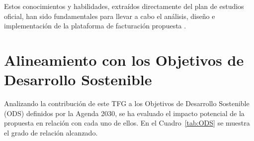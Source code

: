\begin{large}
Estos conocimientos y habilidades, extraídos directamente del plan de estudios oficial, han sido fundamentales para llevar a cabo el análisis, diseño e implementación de la plataforma de facturación propuesta \cite{grado2024ulpgc}.

\end{large}

\section{Alineamiento con los Objetivos de Desarrollo Sostenible}

\begin{large}

Analizando la contribución de este TFG a los Objetivos de Desarrollo Sostenible (ODS) definidos por la Agenda 2030, se ha evaluado el impacto potencial de la propuesta en relación con cada uno de ellos. En el Cuadro~\ref{tab:ODS} se muestra el grado de relación alcanzado.


\end{large}
